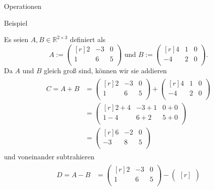 \documentclass[
  8pt,
  ignorenonframetext,
]{beamer}
\begin{document}
\begin{frame}{Operationen}
\protect\hypertarget{operationen-3}{}
\small

Beispiel

\footnotesize

Es seien \(A,B\in \mathbb{R}^{2\times 3}\) definiert als
\begin{equation}
A:=\begin{pmatrix*}[r]
2 & -3 & 0\\
1 &  6 & 5\\
\end{pmatrix*}
\mbox{ und }
B := \begin{pmatrix*}[r]
 4 & 1 & 0\\
-4 & 2 & 0\\
\end{pmatrix*}.
\end{equation} Da \(A\) und \(B\) gleich groß sind, können wir sie
addieren \begin{align}
\begin{split}
C
= A+B
& =
\begin{pmatrix*}[r]
2 & -3 & 0\\
1 &  6 & 5\\
\end{pmatrix*}
+
\begin{pmatrix*}[r]
 4 & 1 & 0\\
-4 & 2 & 0\\
\end{pmatrix*}\\
& =
\begin{pmatrix*}[r]
2 + 4 & -3 + 1 & 0 + 0\\
1 - 4 &  6 + 2 & 5 + 0\\
\end{pmatrix*}\\
& =
\begin{pmatrix*}[r]
6 & -2 & 0\\
-3 &  8 & 5 \\
\end{pmatrix*}
\end{split}
\end{align} und voneinander subtrahieren \begin{align}
\begin{split}
D
= A-B
& =
\begin{pmatrix*}[r]
2 & -3 & 0\\
1 &  6 & 5\\
\end{pmatrix*}
-
\begin{pmatrix*}[r]

\end{pmatrix*}
\end{split}
\end{align}
\end{frame}
\end{document}
